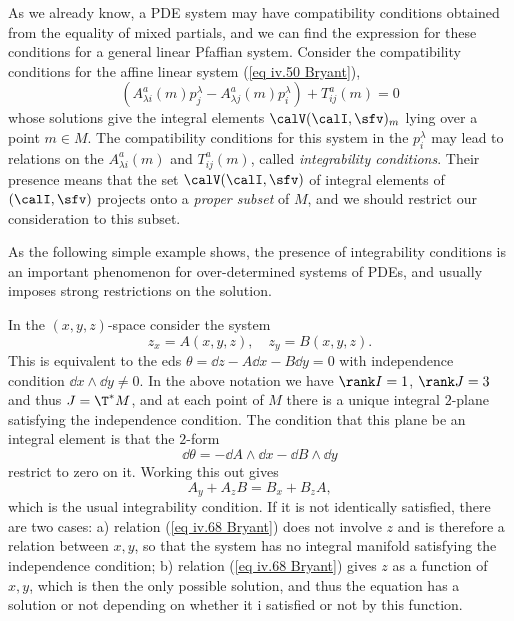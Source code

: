 As we already know, a PDE system may have compatibility conditions obtained from the equality of mixed partials, and we can find the expression for these conditions for a general linear Pfaffian system. Consider the compatibility conditions for the affine linear system (\ref{eq iv.50 Bryant}),
\[\left(A^a_{\lambda i}(m)p^\lambda_j-A^a_{\lambda j}(m)p^\lambda_i\right)+T^a_{ij}(m)=0\label{eq iv.65 Bryant}\]
whose solutions give the integral elements $\calV(\calI,\sfv)_m$ lying over a point $m\in M$. The compatibility conditions for this system in the $p^\lambda_i$ may lead to relations on the $A^a_{\lambda i}(m)$ and $T^a_{ij}(m)$, called \emph{integrability conditions}. Their presence means that the set $\calV(\calI,\sfv)$ of integral elements of $(\calI,\sfv)$ projects onto a \emph{proper subset} of $M$, and we should restrict our consideration to this subset.

As the following simple example shows, the presence of integrability conditions is an important phenomenon for over-determined systems of PDEs, and usually imposes strong restrictions on the solution.

\begin{example}
    In the $(x,y,z)$-space consider the system 
    \[z_x=A(x,y,z),\quad z_y=B(x,y,z).\]
    This is equivalent to the \gls{eds} $\theta=\dd z-A\dd x-B\dd y=0$ with independence condition $\dd x\wedge\dd y\neq 0$. In the above notation we have $\rank I=1$, $\rank J=3$ and thus $J=\T^\ast M$, and at each point of $M$ there is a unique integral $2$-plane satisfying the independence condition. The condition that this plane be an integral element is that the $2$-form
    \[\dd\theta=-\dd A\wedge\dd x-\dd B\wedge\dd y\]
    restrict to zero on it. Working this out gives 
    \[A_y+A_z B=B_x+B_z A,\label{eq iv.68 Bryant}\]
    which is the usual integrability condition. If it is not identically satisfied, there are two cases: a) relation (\ref{eq iv.68 Bryant}) does not involve $z$ and is therefore a relation between $x,y$, so that the system has no integral manifold satisfying the independence condition; b) relation (\ref{eq iv.68 Bryant}) gives $z$ as a function of $x,y$, which is then the only possible solution, and thus the equation has a solution or not depending on whether it i satisfied or not by this function.
\end{example}

